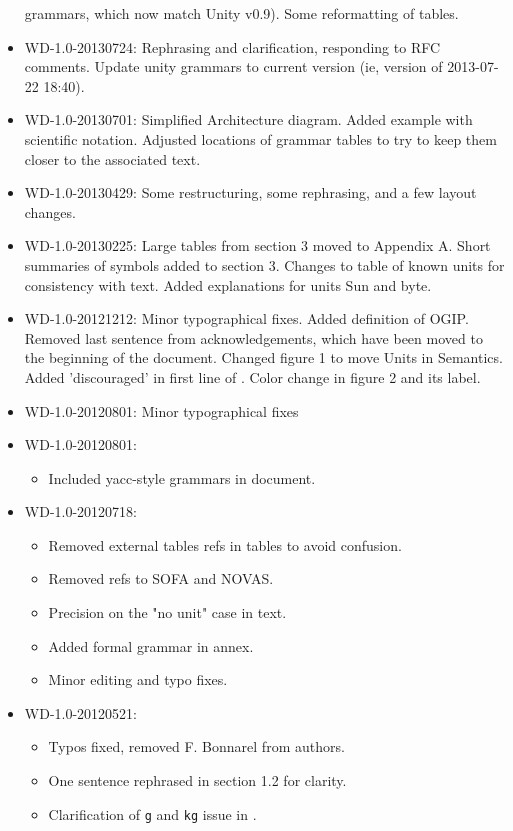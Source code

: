 \documentclass[11pt,a4paper]{ivoa}
\newcommand{\unit}[1]{\texttt{\small\color{orange}#1}}
\begin{document}
\begin{itemize}
grammars, which now match Unity v0.9).  Some reformatting of tables.
\item WD-1.0-20130724: Rephrasing and clarification, responding to RFC
comments.  Update unity grammars to current version (ie, version of 2013-07-22 18:40).
\item WD-1.0-20130701: Simplified Architecture diagram. Added example
with scientific notation.  Adjusted locations of grammar tables to try
to keep them closer to the associated text.
\item WD-1.0-20130429: Some restructuring, some rephrasing, and a few layout changes.
\item WD-1.0-20130225: Large tables from section 3 moved to Appendix A. Short summaries of symbols added
to section 3. Changes to table of known units for consistency with text. Added explanations for units Sun and byte.  
\item WD-1.0-20121212:
Minor typographical fixes. Added definition of OGIP. Removed last sentence from acknowledgements, which have been moved to the beginning of the document. Changed figure 1 to move Units in Semantics. Added 'discouraged' in first line of . Color change in figure 2 and its label.
\item WD-1.0-20120801:
Minor typographical fixes
\item WD-1.0-20120801:
  \begin{itemize}
    \item Included yacc-style grammars in document.
    \end{itemize}
\item WD-1.0-20120718:
	\begin{itemize}
	\item Removed external tables refs in tables to avoid confusion.
	\item Removed refs to SOFA and NOVAS.
	\item Precision on the "no unit" case in text.
	\item Added formal grammar in annex.
	\item Minor editing and typo fixes.
	\end{itemize}
\item WD-1.0-20120521:
	\begin{itemize}
	\item Typos fixed, removed F. Bonnarel from authors. 
	\item One sentence rephrased in section 1.2 for clarity.
	\item Clarification of \unit{g} and \unit{kg} issue in .

\end{itemize}
\end{itemize}
\end{document}
